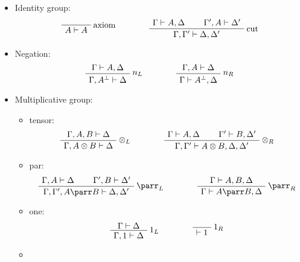 \begin{itemize}
\item
  Identity group: 
  \begin{equation*}
  \LabelRule{\rulename{axiom}}
  \NulRule{ A \vdash A }
  \DisplayProof
  \qquad\qquad
  \AxRule{ \Gamma \vdash A, \Delta }
  \AxRule{ \Gamma', A \vdash \Delta' }
  \LabelRule{\rulename{cut}}
  \BinRule{ \Gamma, \Gamma' \vdash \Delta, \Delta' }
  \DisplayProof  
  \end{equation*}
\item
  Negation: 
  \begin{equation*}
    \AxRule{ \Gamma \vdash A,\Delta }
    \LabelRule{n_L}
    \UnaRule{\Gamma, A\orth \vdash \Delta }
    \DisplayProof
    \qquad\qquad
    \AxRule{ \Gamma, A \vdash \Delta }
    \LabelRule{n_R}
    \UnaRule{ \Gamma \vdash A\orth, \Delta }
    \DisplayProof
  \end{equation*}
\item
  Multiplicative group:
  \begin{itemize}
  \item
    tensor: 
    \begin{equation*}
      \AxRule{ \Gamma, A, B \vdash \Delta }
      \LabelRule{ \tens_L }
      \UnaRule{ \Gamma, A \tens B \vdash \Delta }
      \DisplayProof
      \qquad\qquad
      \AxRule{ \Gamma \vdash A, \Delta }
      \AxRule{ \Gamma' \vdash B, \Delta' }
      \LabelRule{ \tens_R }
      \BinRule{ \Gamma, \Gamma' \vdash A \tens B, \Delta, \Delta' }
      \DisplayProof      
    \end{equation*}
  \item
    par: 
    \begin{equation*}
      \AxRule{ \Gamma, A \vdash \Delta }
      \AxRule{ \Gamma', B \vdash \Delta' }
      \LabelRule{ \parr_L }
      \BinRule{ \Gamma, \Gamma', A \parr B \vdash \Delta, \Delta' }
      \DisplayProof
      \qquad\qquad
      \AxRule{ \Gamma \vdash A, B, \Delta }
      \LabelRule{ \parr_R }
      \UnaRule{ \Gamma \vdash A \parr B, \Delta }
      \DisplayProof    
    \end{equation*}
  \item
    one:
    \begin{equation*}
       \AxRule{ \Gamma \vdash \Delta }
       \LabelRule{\one_L }
       \UnaRule{ \Gamma, \one \vdash \Delta }
       \DisplayProof
       \qquad\qquad
       \LabelRule{ \one_R }
       \NulRule{ \vdash \one }
       \DisplayProof   
    \end{equation*}
  \item

\end{itemize}
\end{itemize}
